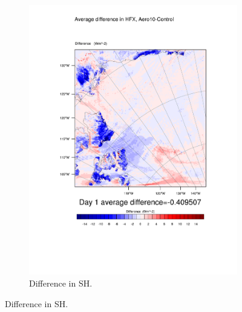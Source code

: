 \begin{figure}
\begin{subfigure}{0.48\textwidth}
		\includegraphics[width=\textwidth]{results/aero10/diff_Aero10_HFX_Day1.pdf}
		\caption{Difference in SH.}
		\label{subfig:sh_r3Day5}
	\end{subfigure}


\end{figure}
